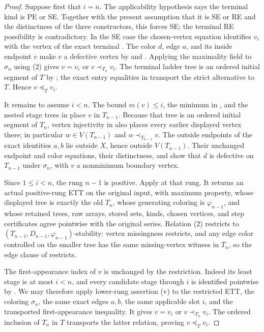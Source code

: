 \begin{proof}
Suppose first that \(i=n\). The applicability hypothesis says the
terminal kind is PE or SE. Together with the present assumption that it
is SE or RE and the distinctness of the three constructors, this forces
SE; the terminal RE possibility is contradictory. In the SE case the
chosen-vertex equation identifies \(v_i\) with the vertex of the exact
terminal . The color \(d\), edge \(a\),
and its inside endpoint \(v\) make \(v\) a defective vertex by
 and . Applying the
maximality field to \(\sigma_n\) using (2) gives
\(v=v_i\) or \(v\prec_{T_n}v_i\). The terminal ladder tree is an ordered
initial segment of \(T\) by ; the exact
entry equalities in  transport the
strict alternative to \(T\). Hence \(v\preceq_Tv_i\).

It remains to assume \(i<n\). The bound \(m(v)\leq i\), the minimum in
, and the nested stage trees in
 place \(v\) in \(T_{n-1}\). Because that
tree is an ordered initial segment of \(T_n\), vertex injectivity in
 also places every earlier displayed vertex there;
in particular \(w\in V(T_{n-1})\) and
\(w\prec_{T_{n-1}}v\). The outside endpoints of the exact identities
\(a,b\) lie outside \(X\), hence outside \(V(T_{n-1})\). Their unchanged
endpoint and color equations, their distinctness, and
 show that \(d\) is defective on \(T_{n-1}\)
under \(\sigma_n\), with \(v\) a nonminimum boundary vertex.

Since \(1\leq i<n\), the rung \(n-1\) is positive. Apply
 at that rung. It returns an actual
positive-rung ETT on the original input, with maximum property, whose
displayed tree is exactly the old \(T_n\), whose generating coloring is
\(\varphi_{n-1}\), and whose retained trees, raw arrays, stored sets,
kinds, chosen vertices, and step certificates agree pointwise with the
original series. Relation (2) restricts to
\((T_{n-1},D_{n-1},\varphi_{n-1})\)-stability: vertex missingness
restricts, and any edge color controlled on the smaller tree has the
same missing-vertex witness in \(T_n\), so the edge clause of
 restricts.

The first-appearance index of \(v\) is unchanged by the restriction.
Indeed its least stage is at most \(i<n\), and every candidate stage
through \(i\) is identified pointwise by
. We may therefore apply lower-rung
assertion (v) to the restricted ETT, the coloring \(\sigma_n\), the same
exact edges \(a,b\), the same applicable slot \(i\), and the transported
first-appearance inequality. It gives
\(v=v_i\) or \(v\prec_{T_n}v_i\). The ordered inclusion of \(T_n\) in
\(T\) transports the latter relation, proving \(v\preceq_Tv_i\).
\end{proof}
